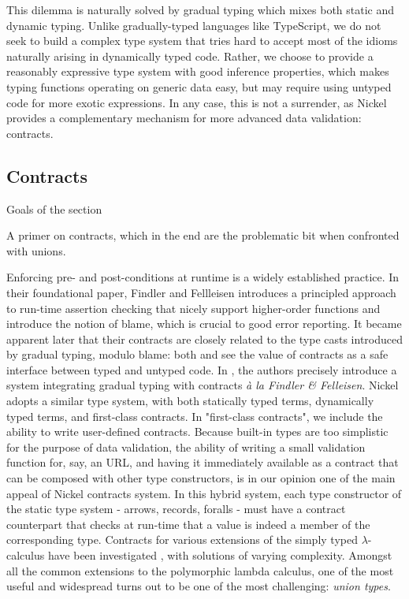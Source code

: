 \documentclass{article}
\newcommand{\unsure}[2][1=]{}
\begin{document}
This dilemma is naturally solved by gradual typing\cite{Siek06gradualtyping}
which mixes both static and dynamic typing. Unlike gradually-typed languages
like TypeScript\unsure{Todo: explain that typescript uses unions as
  static typing whereas we are speaking of dynamic contracts}, we do not seek to build a complex type system that tries hard
to accept most of the idioms naturally arising in dynamically typed code.
Rather, we choose to provide a reasonably expressive type system with good
inference properties, which makes typing functions operating on generic data easy,
but may require using untyped code for more exotic expressions.  In any case,
this is not a surrender, as Nickel provides a complementary mechanism for more
advanced data validation: contracts.

\subsection{Contracts}
{\color{red}Goals of the section

A primer on contracts, which in the end are the problematic bit when confronted
with unions.\vspace{0.5cm}}

Enforcing pre- and post-conditions at runtime is a widely established practice.
In their foundational paper\cite{FindlerFelleisenHOContracts}, Findler and
Fellleisen introduces a principled approach to run-time assertion checking that
nicely support higher-order functions and introduce the notion of blame, which
is crucial to good error reporting. It became apparent later that their
contracts are closely related to the type casts introduced by gradual typing,
modulo blame: both \cite{FindlerMultiLang} and \cite{FelleisenInterLang} see the
value of contracts as a safe interface between typed and untyped code. In
\cite{WellTypedBlamed}, the authors precisely introduce a system integrating
gradual typing with contracts \textit{à la Findler \& Felleisen}. Nickel adopts
a similar type system, with both statically typed terms, dynamically typed
terms, and first-class contracts. In "first-class contracts", we include the
ability to write user-defined contracts. Because built-in types are too
simplistic for the purpose of data validation, the ability of writing a small
validation function for, say, an URL, and having it immediately available as a
contract that can be composed with other type constructors, is in our
opinion one of the main appeal of Nickel contracts system. In this hybrid
system, each type constructor of the static type system - arrows, records,
foralls - must have a contract counterpart that checks at run-time that a value
is indeed a member of the corresponding type. Contracts for various extensions
of the simply typed $\lambda$-calculus have been investigated \cite{BlameForAll,
    KeilThiemannUnionIntersection, RootCauseOfBlame, DependentContracts,
GradualTypingClasses}, with solutions of varying complexity.  Amongst all the
common extensions to the polymorphic lambda calculus, one of the most useful and
widespread turns out to be one of the most challenging: \emph{union types}.
\end{document}
